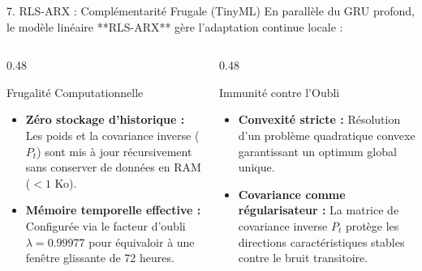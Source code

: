 \documentclass[10pt,aspectratio=169]{beamer}
\begin{document}
\begin{frame}{7. RLS-ARX : Complémentarité Frugale (TinyML)}
  En parallèle du GRU profond, le modèle linéaire **RLS-ARX** gère l'adaptation continue locale :
  
  \begin{columns}[T]
    \begin{column}{0.48\textwidth}
      \begin{block}{Frugalité Computationnelle}
        \begin{itemize}
          \item \textbf{Zéro stockage d'historique :} Les poids et la covariance inverse ($P_t$) sont mis à jour récursivement sans conserver de données en RAM ($< 1$ Ko).
          \item \textbf{Mémoire temporelle effective :} Configurée via le facteur d'oubli $\lambda = 0.99977$ pour équivaloir à une fenêtre glissante de 72 heures.
        \end{itemize}
      \end{block}
    \end{column}
    
    \begin{column}{0.48\textwidth}
      \begin{exampleblock}{Immunité contre l'Oubli}
        \begin{itemize}
          \item \textbf{Convexité stricte :} Résolution d'un problème quadratique convexe garantissant un optimum global unique.
          \item \textbf{Covariance comme régularisateur :} La matrice de covariance inverse $P_t$ protège les directions caractéristiques stables contre le bruit transitoire.
        \end{itemize}
      \end{exampleblock}
    \end{column}
  \end{columns}
\end{frame}
\end{document}
